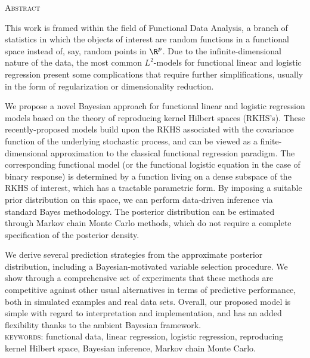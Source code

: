 %
%

\begin{center}
  \begin{Large}
  \textsc{Abstract}
\end{Large}
\end{center}

\noindent This work is framed within the field of Functional Data Analysis, a branch of statistics in which the objects of interest are random functions in a functional space instead of, say, random points in \(\R^p\). Due to the infinite-dimensional nature of the data, the most common \(L^2\)-models for functional linear and logistic regression present some complications that require further simplifications, usually in the form of regularization or dimensionality reduction.

We propose a novel Bayesian approach for functional linear and logistic regression models based on the theory of reproducing kernel Hilbert spaces (RKHS's). These recently-proposed models build upon the RKHS associated with the covariance function of the underlying stochastic process, and can be viewed as a finite-dimensional approximation to the classical functional regression paradigm. The corresponding functional model (or the functional logistic equation in the case of binary response) is determined by a function living on a dense subspace of the RKHS of interest, which has a tractable parametric form. By imposing a suitable prior distribution on this space, we can perform data-driven inference via standard Bayes methodology. The posterior distribution can be estimated through Markov chain Monte Carlo methods, which do not require a complete specification of the posterior density.

We derive several prediction strategies from the approximate posterior distribution, including a Bayesian-motivated variable selection procedure. We show through a comprehensive set of experiments that these methods are competitive against other usual alternatives in terms of predictive performance, both in simulated examples and real data sets. Overall, our proposed model is simple with regard to interpretation and implementation, and has an added flexibility thanks to the ambient Bayesian framework.\\

\noindent
\textsc{keywords:} functional data, linear regression, logistic regression, reproducing kernel Hilbert space, Bayesian inference, Markov chain Monte Carlo.
